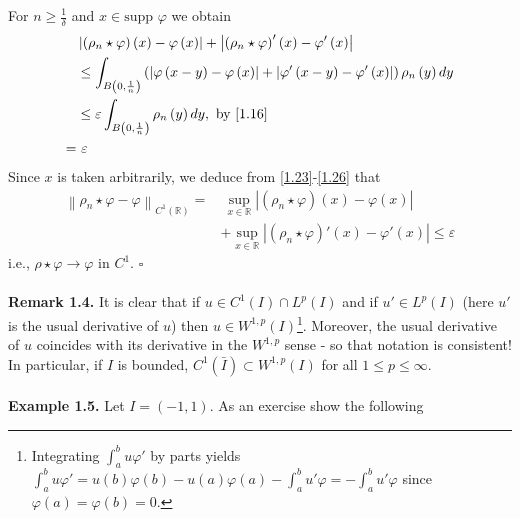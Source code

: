 \documentclass[a4paper,oneside]{article}
\numberwithin{equation}{section}
\begin{document}
For $n\ge \frac{1}{\delta}$ and $x\in \mbox{supp }\varphi$ we obtain
\begin{align}
\label{1.23}
&\left| {\left( {{\rho _n}\star \varphi } \right)\left( x \right) - \varphi \left( x \right)} \right| + \left| {\left( {{\rho _n}\star\varphi } \right)'\left( x \right) - \varphi '\left( x \right)} \right|\\
 &\le \int_{B\left( {0,\frac{1}{n}} \right)} {\left( {\left| {\varphi \left( {x - y} \right) - \varphi \left( x \right)} \right| + \left| {\varphi '\left( {x - y} \right) - \varphi '\left( x \right)} \right|} \right){\rho _n}\left( y \right)dy} \\
& \le \varepsilon \int_{B\left( {0,\frac{1}{n}} \right)} {{\rho _n}\left( y \right)dy},\mbox{ by \eqref{1.16}}\\
=&\ \varepsilon  \label{1.26}
\end{align}
Since $x$ is taken arbitrarily, we deduce from \eqref{1.23}-\eqref{1.26} that
\begin{align}
{\left\| {{\rho _n}\star \varphi  - \varphi } \right\|_{{C^1}\left( \mathbb{R} \right)}} =&\ \mathop {\sup }\limits_{x \in \mathbb{R}} \left| {\left( {{\rho _n}\star \varphi } \right)\left( x \right) - \varphi \left( x \right)} \right| \\
&+ \mathop {\sup }\limits_{x \in \mathbb{R}} \left| {\left( {{\rho _n}\star\varphi } \right)'\left( x \right) - \varphi '\left( x \right)} \right| \le \varepsilon 
\end{align}
i.e., $\rho \star \varphi \to \varphi$ in $C^1$. \hfill $\square$\\
\\
\textbf{Remark 1.4.} It is clear that if $u \in {C^1}\left( I \right) \cap {L^p}\left( I \right)$ and if $u' \in {L^p}\left( I \right)$ (here $u'$ is the usual derivative of $u$) then $u\in W^{1,p}\left(I\right)$\footnote{Integrating $\int_a^b {u\varphi '} $ by parts yields $\int_a^b {u\varphi '}  = u\left( b \right)\varphi \left( b \right) - u\left( a \right)\varphi \left( a \right) - \int_a^b {u'\varphi }  =  - \int_a^b {u'\varphi } $ since $\varphi \left(a\right)=\varphi \left(b\right)=0$.}. Moreover, the usual derivative of $u$ coincides with its derivative in the $W^{1,p}$ sense - so that notation is consistent! In particular, if $I$ is bounded, ${C^1}\left( {\bar I } \right) \subset {W^{1,p}}\left( I \right)$ for all $1\le p \le \infty$.\\
\\
\textbf{Example 1.5.} Let $I=\left(-1,1\right)
$. As an exercise show the following
\end{document}
